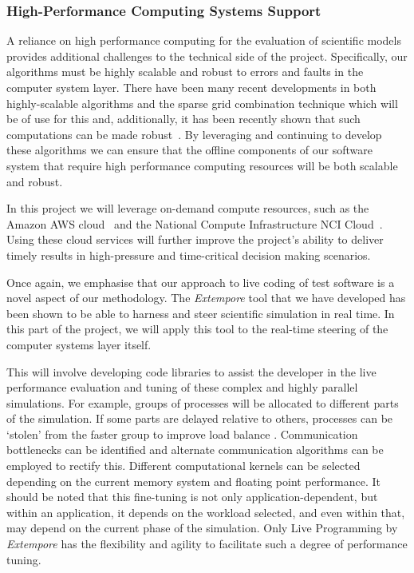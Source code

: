 \subsubsection*{High-Performance Computing Systems Support}

A reliance on high performance computing for the evaluation of
scientific models provides additional challenges to the technical side
of the project. Specifically, our algorithms must be highly scalable
and robust to errors and faults in the computer system layer. There
have been many recent developments in both highly-scalable algorithms
and the sparse grid combination technique \cite{sgctalg15,pdsec15extsgctalg} 
which will be of use for
this and, additionally, it has been recently shown that such
computations can be made
robust~\parencite{HardingHLS2015,AliEtal2015,Ali11022016}. By leveraging and
continuing to develop these algorithms we can ensure that the
offline components of our software system that require high performance
computing resources will be both scalable and robust.

In this project we will leverage on-demand compute resources, such as
the Amazon AWS cloud~\parencite{amazonAws} and the National Compute
Infrastructure NCI Cloud~\parencite{nciCloud}. Using these cloud
services will further improve the project's ability to deliver timely
results in high-pressure and time-critical decision making scenarios.

Once again, we emphasise that our approach to live coding of test
software is a novel aspect of our methodology. The \emph{Extempore}
tool that we have developed has been shown to be able to harness and
steer scientific simulation in real time. In this part of the project,
we will apply this tool to the real-time steering of the computer
systems layer itself.

This will involve developing code libraries to assist the developer in
the live performance evaluation and tuning of these complex and highly
parallel simulations. For example, groups of processes will be
allocated to different parts of the simulation. If some parts are
delayed relative to others, processes can be `stolen' from the faster
group to improve load balance \cite{parSGCT16}. Communication
bottlenecks can be identified and alternate communication algorithms
can be employed to rectify this.  Different computational kernels can
be selected depending on the current memory system and floating point
performance.  It should be noted that this fine-tuning is not only
application-dependent, but within an application, it depends on the
workload selected, and even within that, may depend on the current
phase of the simulation. Only Live Programming by \emph{Extempore} has
the flexibility and agility to facilitate such a degree of performance
tuning.

